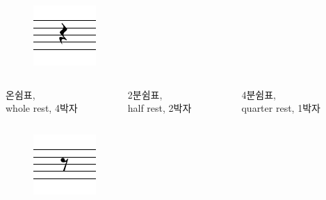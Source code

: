 \documentclass{beamer}
\begin{document}
\begin{frame}
\begin{columns}
\begin{column}{0.33\textwidth}
				\centering
				\noindent
				\begin{figure}[h!]
					\includegraphics[width=0.7\columnwidth]{res/pdf/4/rest/quarter.pdf}
				\end{figure}
			\end{column}
		\end{columns}
		\vskip -1pc
		\begin{columns}
			\begin{column}{0.33\textwidth}
				\centering
				\small 온쉼표,\\whole rest, 4박자
			\end{column}
			\begin{column}{0.33\textwidth}
				\centering
				\small 2분쉼표,\\half rest, 2박자
			\end{column}
			\begin{column}{0.33\textwidth}
				\centering
				\small 4분쉼표,\\quarter rest, 1박자
			\end{column}
		\end{columns}
		\vskip -1pc
		\begin{columns}
			\begin{column}{0.33\textwidth}
				\centering
				\noindent
				\begin{figure}[h!]
					\includegraphics[width=0.7\columnwidth]{res/pdf/4/rest/eighth.pdf}

\end{figure}
\end{column}
\end{columns}
\end{frame}
\end{document}
